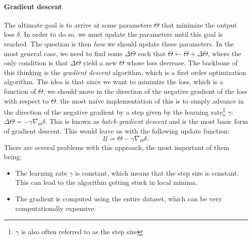         \paragraph{Gradient descent}
        The ultimate goal is to arrive at some parameters $\Theta$ that minimize the output loss $\delta$. In order to do so, we must update the parameters until this goal is reached. The question is then \textit{how} we should update these parameters. In the most general case, we need to find some $\Delta\Theta$ such that $\Theta \leftarrow \Theta + \Delta\Theta$, where the only condition is that $\Delta\Theta$ yield a new $\Theta$ whose loss decrease. The backbone of this thinking is the \textit{gradient descent} algorithm, which is a first order optimization algorithm. The idea is that since we want to minimize the loss, which is a function of $\Theta$, we should move in the direction of the negative gradient of the loss with respect to $\Theta$. the most naïve implementation of this is to simply advance in the direction of the negative gradient by a step given by the learning rate\footnote{$\gamma$ is also often referred to as the step size} $\gamma$: $\Delta\Theta = -\gamma\nabla_\Theta\delta$. This is known as \textit{batch gradient descent} and is the most basic form of gradient descent. This would leave us with the following update function:
        \begin{equation}\label{eq:ML:NN:gradient_descent:update_function}
            \mathcal{U} =  \Theta - \gamma\nabla_\Theta\delta.
        \end{equation}
        There are several problems with this approach, the most important of them being:
        \begin{itemize}
            \item The learning rate $\gamma$ is constant, which means that the step size is constant. This can lead to the algorithm getting stuck in local minima.
            \item The gradient is computed using the entire dataset, which can be very computationally expensive.
        \end{itemize}
    
